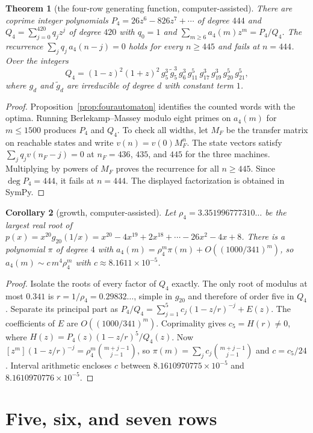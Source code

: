 \documentclass[12pt]{article}
\theoremstyle{plain}
\newtheorem{theorem}{Theorem}
\newtheorem{corollary}[theorem]{Corollary}
\theoremstyle{definition}
\theoremstyle{remark}
\begin{document}
\begin{theorem}[the four-row generating function, computer-assisted]\label{thm:fourgfexact}
There are coprime integer polynomials $P_4=26z^6-826z^7+\cdots$ of degree $444$ and $Q_4=\sum_{j=0}^{420}q_jz^j$ of degree $420$ with $q_0=1$ and $\sum_{m\ge6}a_4(m)z^m=P_4/Q_4$. The recurrence $\sum_jq_j\,a_4(n-j)=0$ holds for every $n\ge445$ and fails at $n=444$. Over the integers
\[
Q_4=(1-z)^2(1+z)^2\,g_5^3\,\tilde g_5^3\,g_6^3\,g_{11}^5\,g_{17}^3\,g_{19}^3\,g_{20}^5\,g_{21}^5,
\]
where $g_d$ and $\tilde g_d$ are irreducible of degree $d$ with constant term $1$.
\end{theorem}

\begin{proof}
Proposition~\ref{prop:fourautomaton} identifies the counted words with the optima. Running Berlekamp--Massey modulo eight primes on $a_4(m)$ for
$m\le1500$ produces $P_4$ and $Q_4$.
To check all widths, let $M_F$ be the transfer
matrix on reachable states and write $v(n)=v(0)M_F^n$.
The state vectors satisfy $\sum_jq_jv(n_F-j)=0$ at
$n_F=436$, $435$, and $445$ for the three machines.
Multiplying by powers of $M_F$ proves the recurrence for all $n\ge445$. Since $\deg P_4=444$, it fails at $n=444$.
The displayed factorization is obtained in SymPy.
\end{proof}

\begin{corollary}[growth, computer-assisted]\label{cor:fourgrowth}
Let $\rho_4=3.351996777310\ldots$ be the largest real root of $p(x)=x^{20}g_{20}(1/x)=x^{20}-4x^{19}+2x^{18}+\cdots-26x^2-4x+8$. There is a polynomial $\pi$ of degree $4$ with $a_4(m)=\rho_4^m \pi(m)+O((1000/341)^m)$, so $a_4(m)\sim c\,m^4\rho_4^m$ with $c\approx8.1611\times10^{-5}$.
\end{corollary}

\begin{proof}
Isolate the roots of every factor of $Q_4$ exactly. The only root
of modulus at most $0.341$ is $r=1/\rho_4=0.29832\ldots$,
simple in $g_{20}$ and therefore of order five in $Q_4$.
Separate its principal part as
$P_4/Q_4=\sum_{j=1}^{5}c_j(1-z/r)^{-j}+E(z)$.
The coefficients of $E$ are $O((1000/341)^m)$.
Coprimality gives $c_5=H(r)\ne0$, where
$H(z)=P_4(z)(1-z/r)^5/Q_4(z)$.
Now $[z^m](1-z/r)^{-j}=\rho_4^m\binom{m+j-1}{j-1}$, so
$\pi(m)=\sum_jc_j\binom{m+j-1}{j-1}$ and $c=c_5/24$.
Interval arithmetic encloses $c$ between
$8.1610970775\times10^{-5}$ and $8.1610970776\times10^{-5}$.
\end{proof}
\section{Five, six, and seven rows}\label{sec:five}
\end{document}
